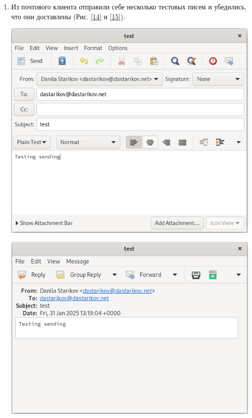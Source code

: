 \begin{enumerate}
\item Из почтового клиента отправили себе несколько тестовых писем и убедились, что они доставлены  (Рис. \ref{14} и \ref{15}).
\begin{center}
    \centering
    \includegraphics[width=\textwidth]{../images/image14.png}
    \label{14}
\end{center}
\begin{center}
    \centering
    \includegraphics[width=\textwidth]{../images/image15.png}
    \label{15}
\end{center}


\end{enumerate}
